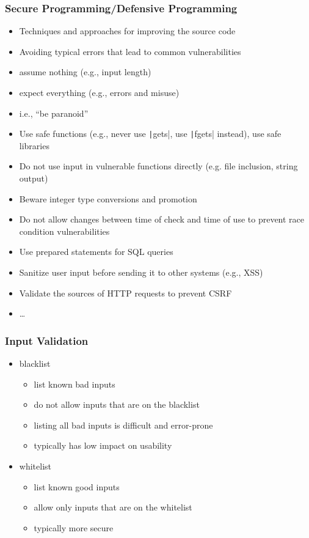 \documentclass[final]{article}
\begin{document}
\subsubsection*{Secure Programming/Defensive Programming}
\begin{itemize}[nosep]
    \item Techniques and approaches for improving the source code
    \item Avoiding typical errors that lead to common vulnerabilities
    \item assume nothing (e.g., input length)
    \item expect everything (e.g., errors and misuse)
    \item i.e., ``be paranoid''
    \item Use safe functions (e.g., never use \texttt|gets|, use \texttt|fgets| instead), use safe libraries
    \item Do not use input in vulnerable functions directly (e.g. file inclusion, string output)
    \item Beware integer type conversions and promotion
    \item Do not allow changes between time of check and time of use to prevent race condition vulnerabilities
    \item Use prepared statements for SQL queries
    \item Sanitize user input before sending it to other systems (e.g., XSS)
    \item Validate the sources of HTTP requests to prevent CSRF
    \item \dots
\end{itemize}
\subsubsection*{Input Validation}
\begin{multicols}{2}
    \begin{itemize}
        \item blacklist
              \begin{itemize}[nosep]
                  \item list known bad inputs
                  \item do not allow inputs that are on the blacklist
                  \item listing all bad inputs is difficult and error-prone\vfill\null
                  \item typically has low impact on usability
              \end{itemize}
        \item whitelist
              \begin{itemize}[nosep]
                  \item list known good inputs
                  \item allow only inputs that are on the whitelist
                  \item typically more secure
              \end{itemize}
    \end{itemize}
\end{multicols}
\end{document}
